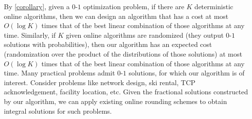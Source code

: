 By \cref{corollary}, given a $0$-$1$ optimization problem, if there are $K$ deterministic online algorithms, then
we can design an algorithm that has a cost at most $O(\log K)$ times that of the best linear combination of those algorithms at any time.
Similarly, if $K$ given online algorithms are randomized (they output $0$-$1$ solutions with probabilities), then our algorithm
has an expected cost (randomization over the product of the distributions of those solutions) at most $O(\log K)$ times that of
the best linear combination of those algorithms at any time. Many practical problems admit $0$-$1$ solutions, for which our algorithm is of interest.
Consider problems like network design, ski rental, TCP acknowledgement, facility location, etc. Given the fractional solutions constructed by our algorithm,
we can apply existing online rounding schemes to obtain integral solutions for such problems.
